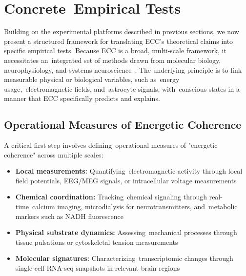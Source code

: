 \section{Concrete~Empirical Tests}

Building on the experimental platforms described in previous sections, we now present a structured framework for translating ECC's theoretical claims into specific empirical tests. Because ECC is a broad, multi-scale framework, it necessitates an~integrated set of methods drawn from molecular biology, neurophysiology, and systems neuroscience~\cite{Northoff2020, Bassett2017}. The underlying principle is to link measurable physical or biological variables, such as~energy usage,~electromagnetic fields, and~astrocyte signals, with~conscious states in a manner that ECC specifically predicts and explains.

\subsection*{Operational Measures of Energetic Coherence}

A critical first step involves defining~operational measures of "energetic coherence" across multiple scales:

\begin{itemize}
    \item \textbf{Local measurements:} Quantifying~electromagnetic activity through local field potentials, EEG/MEG signals, or intracellular voltage measurements~\cite{Michel2018, lee2024cell}
    
    \item \textbf{Chemical coordination:} Tracking~chemical signaling through real-time~calcium imaging, microdialysis for neurotransmitters, and~metabolic markers such as NADH fluorescence~\cite{Zhang2019, Howarth2012}
    
    \item \textbf{Physical substrate dynamics:} Assessing~mechanical processes through tissue pulsations or cytoskeletal tension measurements~\cite{pinotsis2023cytoelectric}
    
    \item \textbf{Molecular signatures:} Characterizing~transcriptomic changes through single-cell RNA-seq snapshots in relevant brain regions~\cite{Gallegos2020, Lake2016}
\end{itemize}

